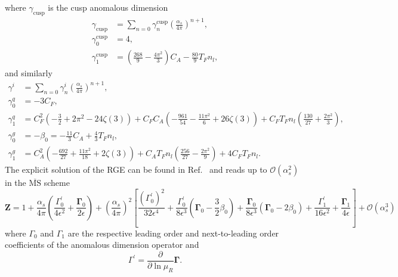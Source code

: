 \documentclass[a4paper,11pt]{article}
\begin{document}
where $\gamma_{\text{cusp}}$ is the cusp anomalous dimension
\begin{equation}
\begin{split}
\gamma_{\text{cusp}} &= \sum_{n = 0} \gamma_n^\text{cusp} \left(\frac{\alpha_s}{4 \pi} \right)^{n + 1}, \\
\gamma_0^{\text{cusp}} &= 4, \\
\gamma_1^{\text{cusp}} &= \left(\frac{268}{9} - \frac{4 \pi^2}{3} \right) C_A - \frac{80}{9} T_F n_l,
\end{split}
\end{equation}
and similarly
\begin{equation}
\begin{split}
\gamma^i &= \sum_{n = 0} \gamma_n^i \left(\frac{\alpha_s}{4 \pi} \right)^{n + 1}, \\
\gamma_0^q &= - 3 C_F, \\
\gamma_1^q &= C_F^2 \left( - \frac{3}{2} + 2 \pi^2 - 24 \zeta(3) \right) + C_F C_A \left(-\frac{961}{54} - \frac{11 \pi^2}{6} + 26 \zeta(3) \right) + C_F T_F n_l \left( \frac{130}{27} + \frac{2 \pi^2}{3} \right), \\
\gamma_0^g &= - \beta_0 = -\frac{11}{3} C_A + \frac{4}{3} T_F n_l, \\
\gamma_1^g &= C_A^2 \left(- \frac{692}{27} + \frac{11 \pi^2}{18} + 2 \zeta(3) \right) + C_A T_F n_l \left(\frac{256}{27} - \frac{2 \pi^2}{9} \right) + 4 C_F T_F n_l.
\end{split}
\end{equation}
The explicit solution of the RGE can be found in Ref.~\cite{Becher:2009cu} and reads up to $\mathcal{O}(\alpha_s^2)$ in the $\overline{\text{MS}}$ scheme
\begin{equation}
\mathbf{Z} = 1 + \frac{\alpha_s}{4 \pi} \left( \frac{\Gamma_0^\prime}{4 \epsilon^2} + \frac{\mathbf{\Gamma}_0}{2 \epsilon} \right) + \left( \frac{\alpha_s}{4 \pi} \right)^2 \left[ \frac{(\Gamma_0^\prime)^2}{32 \epsilon^4} + \frac{\Gamma_0^\prime}{8 \epsilon^3} \left( \mathbf{\Gamma}_0 - \frac{3}{2} \beta_0 \right) + \frac{\mathbf{\Gamma}_0}{8 \epsilon^3} \left( \mathbf{\Gamma}_0 - 2 \beta_0 \right) + \frac{\Gamma_1^\prime}{16 \epsilon^2} + \frac{\mathbf{\Gamma}_1}{4 \epsilon} \right] + \mathcal{O} (\alpha_s^3)
\end{equation}
where $\Gamma_0$ and $\Gamma_1$ are the respective leading order and next-to-leading order coefficients of the anomalous dimension operator and
\begin{equation}
\Gamma^\prime = \frac{\partial}{ \partial \ln \mu_R} \mathbf{\Gamma}.
\end{equation}
\end{document}
